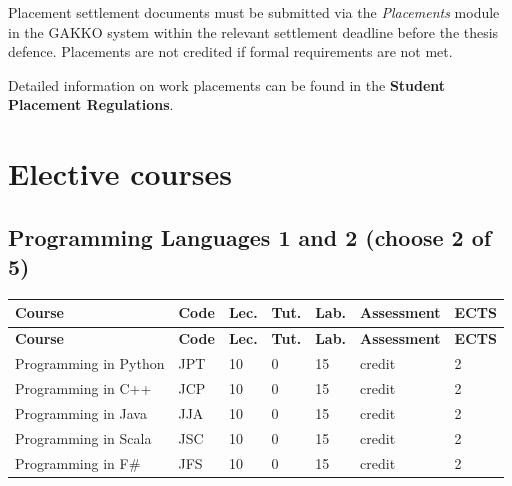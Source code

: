 \documentclass[12pt,a4paper]{article}
\newcommand{\thdrule}{\noalign{\global\setlength{\extrarowheight}{0pt}}}
\newcommand{\thdend}{\noalign{\global\setlength{\extrarowheight}{4pt}}}
\begin{document}
Placement settlement documents must be submitted via the \textit{Placements} module in the GAKKO system within the relevant settlement deadline before the thesis defence. Placements are not credited if formal requirements are not met.

Detailed information on work placements can be found in the \textbf{Student Placement Regulations}.

\newpage

\section{Elective courses}

\subsection*{Programming Languages 1 and 2 (choose 2 of 5)}

{\scriptsize
\begin{longtable}{m{5.5cm}m{0.8cm}m{1cm}m{1cm}m{1cm}m{1.7cm}m{0.7cm}}
\thdrule\toprule
\rowcolor{pjatkRed}
{\color{white}\footnotesize\textbf{\vphantom{Ag}Course}} & {\color{white}\footnotesize\textbf{\vphantom{Ag}Code}} & {\color{white}\footnotesize\textbf{\vphantom{Ag}Lec.}} & {\color{white}\footnotesize\textbf{\vphantom{Ag}Tut.}} & {\color{white}\footnotesize\textbf{\vphantom{Ag}Lab.}} & {\color{white}\footnotesize\textbf{\vphantom{Ag}Assessment}} & {\color{white}\footnotesize\textbf{\vphantom{Ag}ECTS}} \\
\midrule\thdend
\endfirsthead
\thdrule\toprule
\rowcolor{pjatkRed}
{\color{white}\footnotesize\textbf{\vphantom{Ag}Course}} & {\color{white}\footnotesize\textbf{\vphantom{Ag}Code}} & {\color{white}\footnotesize\textbf{\vphantom{Ag}Lec.}} & {\color{white}\footnotesize\textbf{\vphantom{Ag}Tut.}} & {\color{white}\footnotesize\textbf{\vphantom{Ag}Lab.}} & {\color{white}\footnotesize\textbf{\vphantom{Ag}Assessment}} & {\color{white}\footnotesize\textbf{\vphantom{Ag}ECTS}} \\
\midrule\thdend
\endhead
\rowcolor{tableRowLight} Programming in Python & JPT & 10 & 0 & 15 & {\scriptsize credit} & 2 \\
\rowcolor{tableRowAlt} Programming in C++ & JCP & 10 & 0 & 15 & {\scriptsize credit} & 2 \\
\rowcolor{tableRowLight} Programming in Java & JJA & 10 & 0 & 15 & {\scriptsize credit} & 2 \\
\rowcolor{tableRowAlt} Programming in Scala & JSC & 10 & 0 & 15 & {\scriptsize credit} & 2 \\
\rowcolor{tableRowLight} Programming in F\# & JFS & 10 & 0 & 15 & {\scriptsize credit} & 2 \\
\bottomrule
\end{longtable}}
\end{document}
